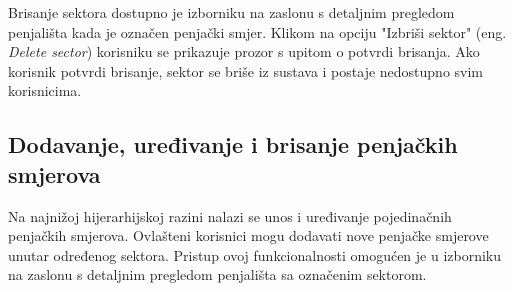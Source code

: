 Brisanje sektora dostupno je izborniku na zaslonu s detaljnim pregledom penjališta kada je označen penjački smjer. Klikom na opciju "Izbriši sektor" (eng. \textit{Delete sector}) korisniku se prikazuje prozor s upitom o potvrdi brisanja. Ako korisnik potvrdi brisanje, sektor se briše iz sustava i postaje nedostupno svim korisnicima.


\subsection{Dodavanje, uređivanje i brisanje penjačkih smjerova}

Na najnižoj hijerarhijskoj razini nalazi se unos i uređivanje pojedinačnih penjačkih smjerova. Ovlašteni korisnici mogu dodavati nove penjačke smjerove unutar određenog sektora. Pristup ovoj funkcionalnosti omogućen je u izborniku na zaslonu s detaljnim pregledom penjališta sa označenim sektorom. 

